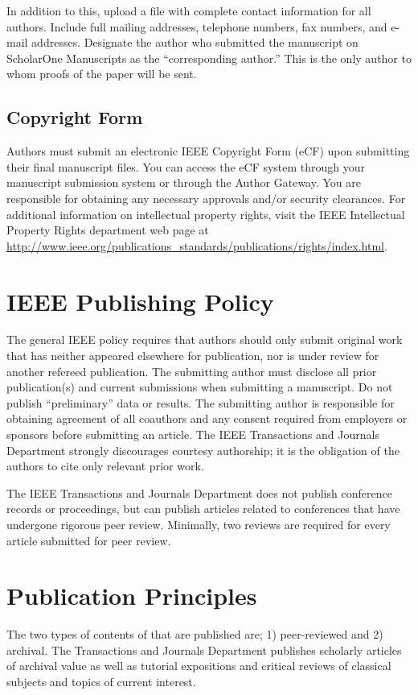 \documentclass[journal,twoside,web]{ieeecolor2}
\begin{document}
In addition to this, upload a file with complete contact information for all 
authors. Include full mailing addresses, telephone numbers, fax numbers, and 
e-mail addresses. Designate the author who submitted the manuscript on 
ScholarOne Manuscripts as the ``corresponding author.'' This is the only 
author to whom proofs of the paper will be sent. 

\subsection{Copyright Form}
Authors must submit an electronic IEEE Copyright Form (eCF) upon submitting 
their final manuscript files. You can access the eCF system through your 
manuscript submission system or through the Author Gateway. You are 
responsible for obtaining any necessary approvals and/or security 
clearances. For additional information on intellectual property rights, 
visit the IEEE Intellectual Property Rights department web page at 
\underline{http://www.ieee.org/publications\_standards/publications/rights/}\discretionary{}{}{}\underline{index.html}. 

\section{IEEE Publishing Policy}
The general IEEE policy requires that authors should only submit original 
work that has neither appeared elsewhere for publication, nor is under 
review for another refereed publication. The submitting author must disclose 
all prior publication(s) and current submissions when submitting a 
manuscript. Do not publish ``preliminary'' data or results. The submitting 
author is responsible for obtaining agreement of all coauthors and any 
consent required from employers or sponsors before submitting an article. 
The IEEE Transactions and Journals Department strongly discourages courtesy 
authorship; it is the obligation of the authors to cite only relevant prior 
work.

The IEEE Transactions and Journals Department does not publish conference 
records or proceedings, but can publish articles related to conferences that 
have undergone rigorous peer review. Minimally, two reviews are required for 
every article submitted for peer review.

\section{Publication Principles}
The two types of contents of that are published are; 1) peer-reviewed and 2) 
archival. The Transactions and Journals Department publishes scholarly 
articles of archival value as well as tutorial expositions and critical 
reviews of classical subjects and topics of current interest. 
\end{document}
